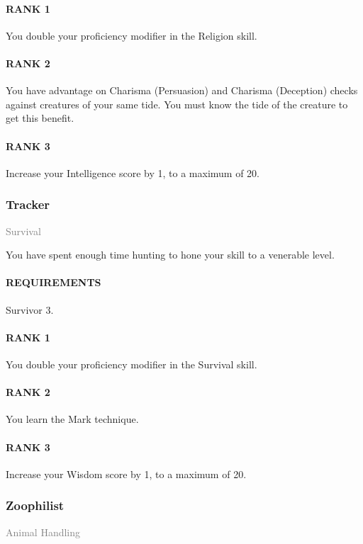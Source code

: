 \paragraph{RANK 1} You double your proficiency modifier in the Religion skill.
\paragraph{RANK 2} You have advantage on Charisma (Persuasion) and Charisma (Deception) checks against creatures of your same tide.
You must know the tide of the creature to get this benefit.
\paragraph{RANK 3} Increase your Intelligence score by 1, to a maximum of 20.

\subsubsection{Tracker} \label{feat::tracker}
\small{\textcolor{gray}{Survival}}

\normalsize
You have spent enough time hunting to hone your skill to a venerable level.
\paragraph{REQUIREMENTS} Survivor 3.
\paragraph{RANK 1} You double your proficiency modifier in the Survival skill.
\paragraph{RANK 2} You learn the Mark technique.
\paragraph{RANK 3} Increase your Wisdom score by 1, to a maximum of 20.

\subsubsection{Zoophilist} \label{feat::zoophilist}
\small{\textcolor{gray}{Animal Handling}}

